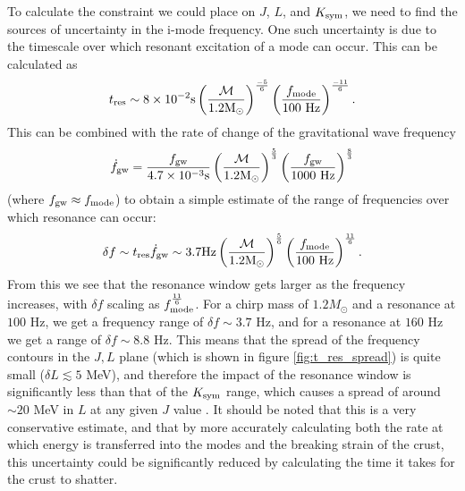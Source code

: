 \documentclass[fleqn,usenatbib]{mnras}
\begin{document}
\hspace{\parindent}To calculate the constraint we could place on $J$, $L$, and $K_{\rm sym}$, we need to find the sources of uncertainty in the i-mode frequency. One such uncertainty is due to the timescale over which resonant excitation of a mode can occur. This can be calculated as \cite{tsang2012resonant}
\begin{align}
t_{\rm res}\sim 8\times10^{-2}\text{s}\left(\frac{\mathcal{M}}{1.2\text{M}_{\odot}}\right)^{\frac{-5}{6}}\left(\frac{f_{\rm mode}}{100 \text{ Hz}}\right)^{\frac{-11}{6}}.
\label{eq:res_timescale}    
\end{align}
\noindent This can be combined with the rate of change of the gravitational wave frequency
\begin{align}
\Dot{f}_{\rm gw}=\frac{f_{\rm gw}}{4.7\times10^{-3}\text{s}}\left(\frac{\mathcal{M}}{1.2\text{M}_{\odot}}\right)^{\frac{5}{3}}\left(\frac{f_{\rm gw}}{1000 \text{ Hz}}\right)^{\frac{8}{3}}
\label{eq:df_GW/dt}    
\end{align}
\noindent (where $f_{\rm gw}\approx f_{\rm mode}$) to obtain a simple estimate of the range of frequencies over which resonance can occur:
\begin{align}
\delta f\sim t_{\rm res}\Dot{f}_{\rm gw}\sim3.7\text{Hz}\left(\frac{\mathcal{M}}{1.2\text{M}_{\odot}}\right)^{\frac{5}{6}}\left(\frac{f_{\rm mode}}{100 \text{ Hz}}\right)^{\frac{11}{6}}.
\label{eq:freq_spread}    
\end{align}
\noindent From this we see that the resonance window gets larger as the frequency increases, with $\delta f$ scaling as $f_{\rm mode}^{\frac{11}{6}}$. For a chirp mass of $1.2M_{\odot}$ and a resonance at $100$ Hz, we get a frequency range of $\delta f\sim 3.7$ Hz, and for a resonance at $160$ Hz we get a range of $\delta f\sim 8.8$ Hz. This means that the spread of the frequency contours in the $J,L$ plane (which is shown in figure \ref{fig:t_res_spread}) is quite small ($\delta L\lesssim 5$ MeV), and therefore the impact of the resonance window is significantly less than that of the $K_{\rm sym}$ range, which causes a spread of around $\sim 20$ MeV in $L$ at any given $J$ value%
. It should be noted that this is a very conservative estimate, and that by more accurately calculating both the rate at which energy is transferred into the modes and the breaking strain of the crust, this uncertainty could be significantly reduced by calculating the time it takes for the crust to shatter.
\end{document}
